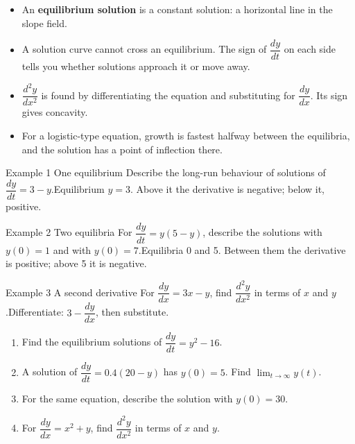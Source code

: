 \documentclass[11pt]{article}
\begin{document}

\begin{ideabox}
\begin{itemize}[leftmargin=*,itemsep=2pt,topsep=2pt]
  \item An \textbf{equilibrium solution} is a constant solution: a horizontal line in the slope field.
  \item A solution curve cannot cross an equilibrium. The sign of $\dfrac{dy}{dt}$ on each side tells you whether solutions approach it or move away.
  \item $\dfrac{d^2y}{dx^2}$ is found by differentiating the equation and substituting for $\dfrac{dy}{dx}$. Its sign gives concavity.
  \item For a logistic-type equation, growth is fastest halfway between the equilibria, and the solution has a point of inflection there.
\end{itemize}
\end{ideabox}

\begin{example}{Example 1 \textperiodcentered{} One equilibrium}
Describe the long-run behaviour of solutions of $\dfrac{dy}{dt}=3-y$.\soln Equilibrium $y=3$. Above it the derivative is negative; below it, positive.
\end{example}

\begin{example}{Example 2 \textperiodcentered{} Two equilibria}
For $\dfrac{dy}{dt}=y(5-y)$, describe the solutions with $y(0)=1$ and with $y(0)=7$.\soln Equilibria 0 and 5. Between them the derivative is positive; above 5 it is negative.
\end{example}

\begin{example}{Example 3 \textperiodcentered{} A second derivative}
For $\dfrac{dy}{dx}=3x-y$, find $\dfrac{d^2y}{dx^2}$ in terms of $x$ and $y$.\soln Differentiate: $3-\dfrac{dy}{dx}$, then substitute.
\end{example}

\newpage
{}

\begin{enumerate}[leftmargin=*,itemsep=2pt]
  \item Find the equilibrium solutions of $\dfrac{dy}{dt}=y^2-16$.\work{2.3cm}
  \item A solution of $\dfrac{dy}{dt}=0.4(20-y)$ has $y(0)=5$. Find $\displaystyle\lim_{t\to\infty}y(t)$.\work{2.3cm}
  \item For the same equation, describe the solution with $y(0)=30$.\work{2.3cm}
  \item For $\dfrac{dy}{dx}=x^2+y$, find $\dfrac{d^2y}{dx^2}$ in terms of $x$ and $y$.\work{2.3cm}
\end{enumerate}
\end{document}
